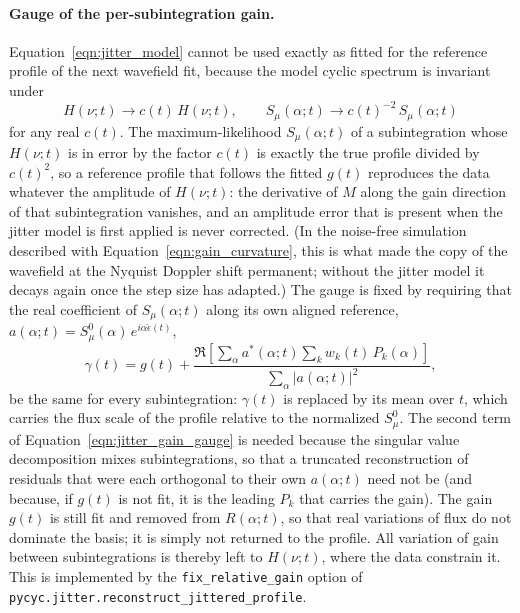 \documentclass[manuscript]{aastex631}
\newcommand{\Eqn}[1]{Equation~\ref{eqn:#1}}
\begin{document}
\paragraph{Gauge of the per-subintegration gain.} \Eqn{jitter_model}
cannot be used exactly as fitted for the reference profile of the next
wavefield fit, because the model cyclic spectrum is invariant under
%
\begin{equation}
H(\nu;t) \to c(t)\,H(\nu;t), \qquad S_\mu(\alpha;t) \to c(t)^{-2}\,S_\mu(\alpha;t)
\label{eqn:gain_degeneracy}
\end{equation}
%
for any real $c(t)$. The maximum-likelihood $S_\mu(\alpha;t)$ of a
subintegration whose $H(\nu;t)$ is in error by the factor $c(t)$ is
exactly the true profile divided by $c(t)^2$, so a reference profile that
follows the fitted $g(t)$ reproduces the data whatever the amplitude of
$H(\nu;t)$: the derivative of $M$ along the gain direction of that
subintegration vanishes, and an amplitude error that is present when the
jitter model is first applied is never corrected. (In the noise-free
simulation described with \Eqn{gain_curvature}, this is what made the copy
of the wavefield at the Nyquist Doppler shift permanent; without the
jitter model it decays again once the step size has adapted.) The gauge is
fixed by requiring that the real coefficient of $S_\mu(\alpha;t)$ along
its own aligned reference,
$a(\alpha;t) = S_\mu^0(\alpha)\,e^{i\alpha\hat\epsilon(t)}$,
%
\begin{equation}
\gamma(t) = g(t) + \frac{\Re\left[\sum_\alpha a^*(\alpha;t) \sum_k w_k(t)\,P_k(\alpha)\right]}
                        {\sum_\alpha \left|a(\alpha;t)\right|^2},
\label{eqn:jitter_gain_gauge}
\end{equation}
%
be the same for every subintegration: $\gamma(t)$ is replaced by its mean
over $t$, which carries the flux scale of the profile relative to the
normalized $S_\mu^0$. The second term of \Eqn{jitter_gain_gauge} is
needed because the singular value decomposition mixes subintegrations, so
that a truncated reconstruction of residuals that were each orthogonal to
their own $a(\alpha;t)$ need not be (and because, if $g(t)$ is not fit,
it is the leading $P_k$ that carries the gain). The gain $g(t)$ is still
fit and removed from $R(\alpha;t)$, so that real variations of flux do not
dominate the basis; it is simply not returned to the profile. All
variation of gain between subintegrations is thereby left to $H(\nu;t)$,
where the data constrain it. This is implemented by the
\texttt{fix\_relative\_gain} option of
\texttt{pycyc.jitter.reconstruct\_jittered\_profile}.
\end{document}
